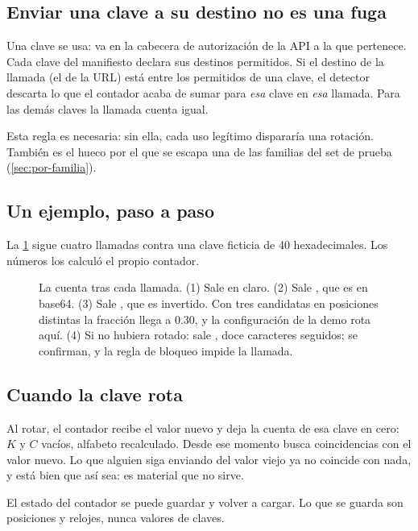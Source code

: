 \subsection{Enviar una clave a su destino no es una fuga}

Una clave se usa: va en la cabecera de autorización de la API a la que pertenece. Cada clave del
manifiesto declara sus destinos permitidos. Si el destino de la llamada (el  de la URL) está
entre los permitidos de una clave, el detector descarta lo que el contador acaba de sumar para
\emph{esa} clave en \emph{esa} llamada. Para las demás claves la llamada cuenta igual.

Esta regla es necesaria: sin ella, cada uso legítimo dispararía una rotación. También es el hueco por
el que se escapa una de las familias del set de prueba (\cref{sec:por-familia}).

\subsection{Un ejemplo, paso a paso}

La \cref{fig:tira} sigue cuatro llamadas contra una clave ficticia de 40 hexadecimales. Los números
los calculó el propio contador.

\begin{figure}[ht]
\centering

\caption{La cuenta tras cada llamada. (1) Sale  en claro. (2) Sale , que es
 en base64. (3) Sale , que es  invertido. Con tres candidatas en
posiciones distintas la fracción llega a \num{0.30}, y la configuración de la demo rota aquí. (4) Si
no hubiera rotado: sale , doce caracteres seguidos; se confirman, y la regla de
bloqueo impide la llamada.}
\label{fig:tira}
\end{figure}

\subsection{Cuando la clave rota}

Al rotar, el contador recibe el valor nuevo y deja la cuenta de esa clave en cero: $K$ y $C$ vacíos,
alfabeto recalculado. Desde ese momento busca coincidencias con el valor nuevo. Lo que alguien siga
enviando del valor viejo ya no coincide con nada, y está bien que así sea: es material que no sirve.

El estado del contador se puede guardar y volver a cargar. Lo que se guarda son posiciones y relojes,
nunca valores de claves.

